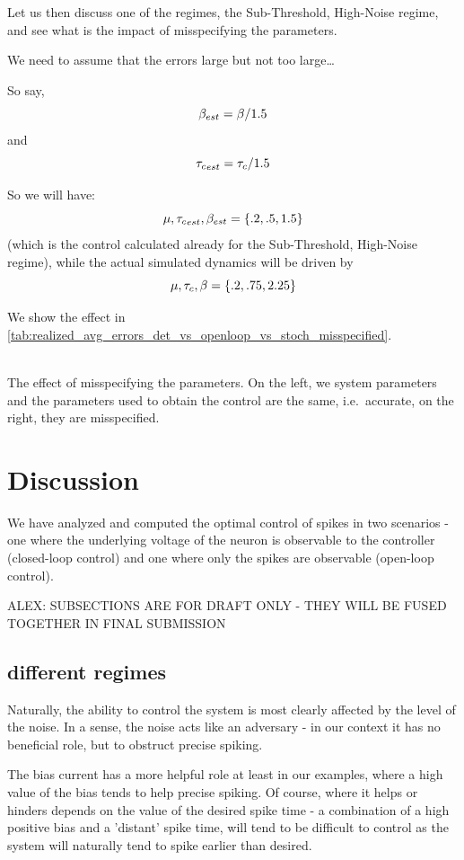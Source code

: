 \documentclass[12pt]{iopart}
\begin{document}
Let us then discuss one of the regimes, the Sub-Threshold,
High-Noise regime, and see what is the impact of misspecifying the parameters.

We need to assume that the errors large but not too large\ldots

So say, $${\beta}_{est} = {\beta} / 1.5$$
and
$${ \tau_{c} }_{est} = { \tau_{c} } / 1.5$$

So we will have:
$$\mu, { \tau_{c} }_{est}, {\beta}_{est} = \{.2, .5, 1.5 \}$$ (which is the control
calculated already for the Sub-Threshold,
High-Noise regime), while the actual simulated dynamics will be driven by
$$\mu, { \tau_{c} }, {\beta} = \{.2, .75, 2.25 \}$$

We show the effect in
\cref{tab:realized_avg_errors_det_vs_openloop_vs_stoch_misspecified}.
\begin{table}[h]
\begin{center}
 \\
 \caption{The effect of misspecifying the parameters. On the left, we
 system parameters and the parameters used to obtain the control are the
 same, i.e.\ accurate, on the right, they are misspecified.}
\label{tab:realized_avg_errors_det_vs_openloop_vs_stoch_misspecified}
\end{center}
\end{table}


\section{Discussion}
We have analyzed and computed the optimal control of spikes in two scenarios -
one where the underlying voltage of the neuron is observable to the controller
(closed-loop control) and one where only the spikes are observable (open-loop
control).

ALEX: SUBSECTIONS ARE FOR DRAFT ONLY - THEY WILL BE FUSED
TOGETHER IN FINAL SUBMISSION
\subsection{different regimes}
Naturally, the ability to control the system is most clearly affected by the
level of the noise. In a sense, the noise acts like an adversary - in our
context it has no beneficial role, but to obstruct precise spiking.

The bias current has a more helpful role at least in our examples, where a
high value of the bias tends to help precise spiking. Of course, where it helps
or hinders depends on the value of the desired spike time - a combination of a
high positive bias and a 'distant' spike time, will tend to be difficult to
control as the system will naturally tend to spike earlier than desired.
\end{document}
